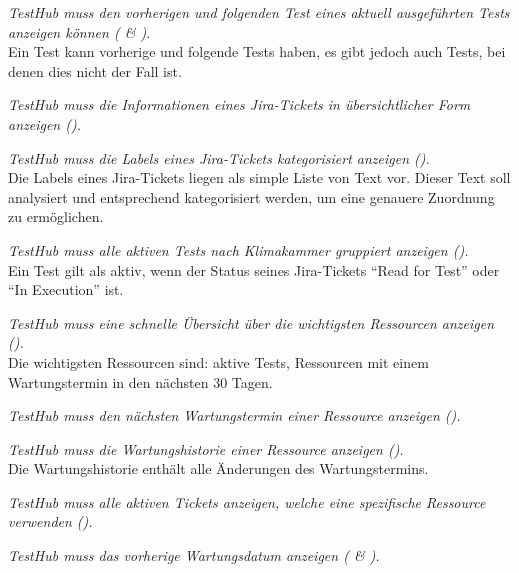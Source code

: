 \begin{description}
    \textit{TestHub muss den vorherigen und folgenden Test eines aktuell 
    ausgeführten Tests anzeigen können ( \& ).}\\
    Ein Test kann vorherige und folgende Tests haben, es gibt jedoch auch Tests,
    bei denen dies nicht der Fall ist.

    \textit{TestHub muss die Informationen eines Jira-Tickets in übersichtlicher 
    Form anzeigen ().}

    \textit{TestHub muss die Labels eines Jira-Tickets kategorisiert anzeigen ().}\\
    Die Labels eines Jira-Tickets liegen als simple Liste von Text vor. Dieser 
    Text soll analysiert und entsprechend kategorisiert werden, um eine genauere 
    Zuordnung zu ermöglichen.

    \textit{TestHub muss alle aktiven Tests nach Klimakammer gruppiert anzeigen ().}\\
    Ein Test gilt als aktiv, wenn der Status seines Jira-Tickets ``Read for Test''
    oder ``In Execution'' ist.

    \textit{TestHub muss eine schnelle Übersicht über die wichtigsten Ressourcen anzeigen ().}\\
    Die wichtigsten Ressourcen sind: aktive Tests, Ressourcen mit einem Wartungstermin
    in den nächsten 30 Tagen.

    \textit{TestHub muss den nächsten Wartungstermin einer Ressource anzeigen ().}
    
    \textit{TestHub muss die Wartungshistorie einer Ressource anzeigen ().}\\
    Die Wartungshistorie enthält alle Änderungen des Wartungstermins.

    \textit{TestHub muss alle aktiven Tickets anzeigen, welche eine spezifische 
    Ressource verwenden ().}

    \textit{TestHub muss das vorherige Wartungsdatum anzeigen ( \& ).}
    

\end{description}
